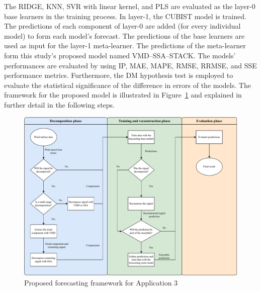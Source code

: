 The \ac{RIDGE}, \ac{KNN}, \ac{SVR} with linear kernel, and \ac{PLS} are evaluated as the layer-0 base learners in the training process. In layer-1, the \ac{CUBIST} model is trained. The predictions of each component of layer-0 are added (for every individual model) to form each model's forecast. The predictions of the base learners are used as input for the layer-1 meta-learner. The predictions of the meta-learner form this study's proposed model named \ac{VMD}--\ac{SSA}--\ac{STACK}. The models' performances are evaluated by using \ac{IP}, \ac{MAE}, \ac{MAPE}, \ac{RMSE}, \ac{RRMSE}, and \ac{SSE} performance metrics. Furthermore, the \ac{DM} hypothesis test is employed to evaluate the statistical significance of the difference in errors of the models. The framework for the proposed model is illustrated in Figure~\ref{fig:framework} and explained in further detail in the following steps.

\begin{figure}[htb!]
    \centering
    \includegraphics[width=\textwidth]{Media/cs3_framework.pdf}
    \caption{Proposed forecasting framework for Application 3}
    \label{fig:framework}
\end{figure}

